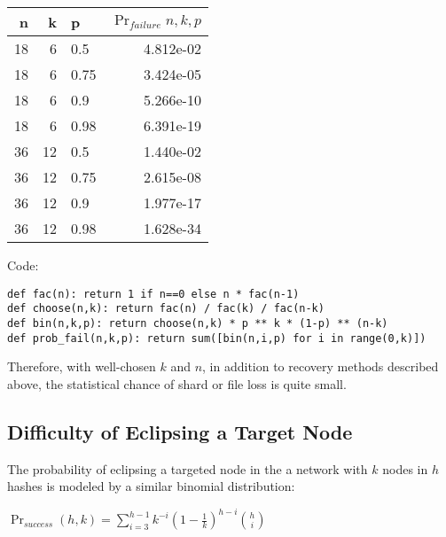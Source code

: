 \documentclass[a4paper,10pt]{article}
\begin{document}
\begin{table}[hbt!]
\begin{center}
\begin{tabular}{r r l r}
n & k & p & $\Pr_{failure}{n,k,p}$\\
\hline  18 & 6  &  0.5  & 4.812e-02\\
\hline  18 & 6  &  0.75 &3.424e-05\\
\hline  18 & 6  &  0.9  & 5.266e-10\\
\hline  18 & 6  &  0.98 &6.391e-19\\
\hline  36 & 12 &  0.5  &1.440e-02\\
\hline  36 & 12 &  0.75 &2.615e-08\\
\hline  36 & 12 &  0.9  &1.977e-17\\
\hline  36 & 12 &  0.98 &1.628e-34\\
\end{tabular}
\end{center}
\end{table}

Code:
\begin{lstlisting}
def fac(n): return 1 if n==0 else n * fac(n-1)
def choose(n,k): return fac(n) / fac(k) / fac(n-k)
def bin(n,k,p): return choose(n,k) * p ** k * (1-p) ** (n-k)
def prob_fail(n,k,p): return sum([bin(n,i,p) for i in range(0,k)])
\end{lstlisting}

Therefore, with well-chosen $ k $ and $ n $, in addition to recovery methods
described above, the statistical chance of shard or file loss is quite small.

\subsection{Difficulty of Eclipsing a Target Node}

The probability of eclipsing a targeted node in the a network with $ k $ nodes
in $ h $ hashes is modeled by a similar binomial distribution:

{\centering
$\Pr_{success}(h, k) = \displaystyle \sum_{i=3}^{h-1}
k^{-i}(1-\frac{1}{k})^{h-i}{h \choose i}$
\\}
\end{document}
